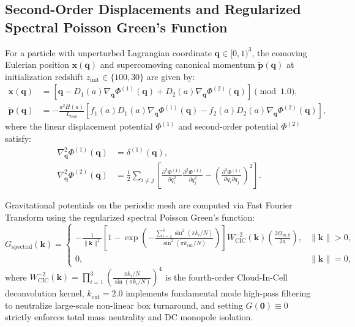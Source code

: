 \documentclass[11pt]{article}
\theoremstyle{plain}
\begin{document}
\subsection{Second-Order Displacements and Regularized Spectral Poisson Green's Function}
\label{app:displacements-green-function}
For a particle with unperturbed Lagrangian coordinate $\mathbf{q} \in [0, 1)^3$, the comoving Eulerian position $\mathbf{x}(\mathbf{q})$ and supercomoving canonical momentum $\tilde{\mathbf{p}}(\mathbf{q})$ at initialization redshift $z_{\mathrm{init}} \in \{100, 30\}$ are given by:
\begin{align}
    \mathbf{x}(\mathbf{q}) &= \left[ \mathbf{q} - D_1(a) \nabla_{\mathbf{q}} \Phi^{(1)}(\mathbf{q}) + D_2(a) \nabla_{\mathbf{q}} \Phi^{(2)}(\mathbf{q}) \right] \pmod{1.0}, \\
    \tilde{\mathbf{p}}(\mathbf{q}) &= -\frac{a^2 H(a)}{L_{\mathrm{box}}} \left[ f_1(a) D_1(a) \nabla_{\mathbf{q}} \Phi^{(1)}(\mathbf{q}) - f_2(a) D_2(a) \nabla_{\mathbf{q}} \Phi^{(2)}(\mathbf{q}) \right],
\end{align}
where the linear displacement potential $\Phi^{(1)}$ and second-order potential $\Phi^{(2)}$ satisfy:
\begin{align}
    \nabla_{\mathbf{q}}^2 \Phi^{(1)}(\mathbf{q}) &= \delta^{(1)}(\mathbf{q}), \\
    \nabla_{\mathbf{q}}^2 \Phi^{(2)}(\mathbf{q}) &= \frac{1}{2} \sum_{i \ne j} \left[ \frac{\partial^2 \Phi^{(1)}}{\partial q_i^2}\frac{\partial^2 \Phi^{(1)}}{\partial q_j^2} - \left( \frac{\partial^2 \Phi^{(1)}}{\partial q_i \partial q_j} \right)^2 \right].
\end{align}

Gravitational potentials on the periodic mesh are computed via Fast Fourier Transform using the regularized spectral Poisson Green's function:
\begin{equation}
    G_{\mathrm{spectral}}(\mathbf{k}) = \begin{cases}
        -\frac{1}{\|\mathbf{k}\|^2} \left[ 1 - \exp\left( - \frac{\sum_{i=1}^3 \sin^2(\pi k_i / N)}{\sin^2(\pi k_{\mathrm{cut}} / N)} \right) \right] W_{\mathrm{CIC}}^{-2}(\mathbf{k}) \left( \frac{3\Omega_{m,0}}{2a} \right), & \|\mathbf{k}\| > 0, \\
        0, & \|\mathbf{k}\| = 0,
    \end{cases}
\end{equation}
where $W_{\mathrm{CIC}}^{-2}(\mathbf{k}) = \prod_{i=1}^3 \left( \frac{\pi k_i / N}{\sin(\pi k_i / N)} \right)^4$ is the fourth-order Cloud-In-Cell deconvolution kernel, $k_{\mathrm{cut}} = 2.0$ implements fundamental mode high-pass filtering to neutralize large-scale non-linear box turnaround, and setting $G(\mathbf{0}) \equiv 0$ strictly enforces total mass neutrality and DC monopole isolation.
\end{document}
